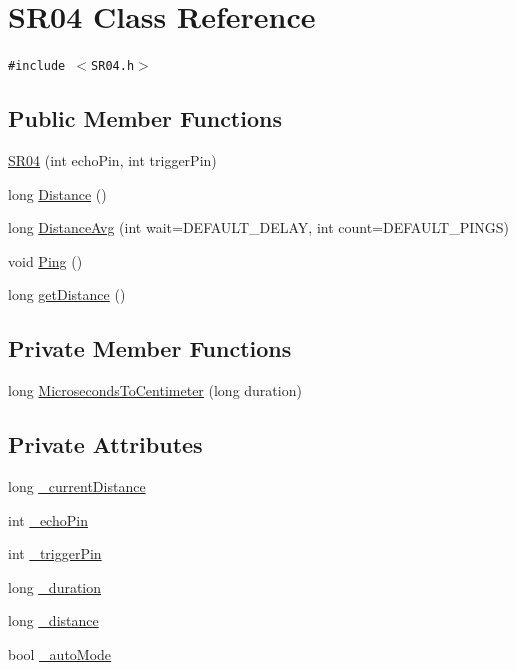 \hypertarget{class_s_r04}{
\section{SR04 Class Reference}
\label{class_s_r04}
}
{\tt \#include $<$SR04.h$>$}

\subsection*{Public Member Functions}
\begin{CompactItemize}
\item 
\hyperlink{class_s_r04_7af7a8b9d80f721c1d2802c1acbf6d10}{SR04} (int echoPin, int triggerPin)
\item 
long \hyperlink{class_s_r04_1fbb097bdcde18aa3095ddc96d41a653}{Distance} ()
\item 
long \hyperlink{class_s_r04_fd9284a5840d1a09c825f4255dba4b7b}{DistanceAvg} (int wait=DEFAULT\_\-DELAY, int count=DEFAULT\_\-PINGS)
\item 
void \hyperlink{class_s_r04_1a76036315b7f13e475988b6ada09ab6}{Ping} ()
\item 
long \hyperlink{class_s_r04_1db22ae175b3fec1619bf858e1b8308e}{getDistance} ()
\end{CompactItemize}
\subsection*{Private Member Functions}
\begin{CompactItemize}
\item 
long \hyperlink{class_s_r04_50c7ecb90dd637067812f1df57fb0211}{MicrosecondsToCentimeter} (long duration)
\end{CompactItemize}
\subsection*{Private Attributes}
\begin{CompactItemize}
\item 
long \hyperlink{class_s_r04_7c1be2e3886d6062108f6ce6914f4713}{\_\-currentDistance}
\item 
int \hyperlink{class_s_r04_455266efca39151130844ade8a71c2bd}{\_\-echoPin}
\item 
int \hyperlink{class_s_r04_093339f25a9fea6bcac46db6f8c8d4b1}{\_\-triggerPin}
\item 
long \hyperlink{class_s_r04_f88aad0e86e807d7d91b989a9da66649}{\_\-duration}
\item 
long \hyperlink{class_s_r04_9edb2f2f92286328ec96704dd12b985c}{\_\-distance}
\item 
bool \hyperlink{class_s_r04_dee423aa1137931b46b8eab5b0a0c2ad}{\_\-autoMode}
\end{CompactItemize}


